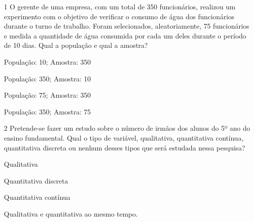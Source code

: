 \num{1} O gerente de uma empresa, com um total de 350 funcionários,
realizou um experimento com o objetivo de verificar o consumo de água
dos funcionários durante o turno de trabalho. Foram selecionados,
aleatoriamente, 75 funcionários e medida a quantidade de água consumida
por cada um deles durante o período de 10 dias. Qual a população e qual
a amostra?

\begin{minipage}{.5\textwidth}
\begin{escolha}
\item
  População: 10; Amostra: 350
\item
  População: 350; Amostra: 10
\item
  População: 75; Amostra: 350
\item
  População: 350; Amostra: 75
\end{escolha}
\end{minipage}

\num{2} Pretende-se fazer um estudo sobre o número de irmãos dos alunos do
5º ano do ensino fundamental. Qual o tipo de variável, qualitativa,
quantitativa contínua, quantitativa discreta ou nenhum desses tipos que
será estudada nessa pesquisa?

\begin{minipage}{.5\textwidth}
\begin{escolha}
\item
  Qualitativa
\item
  Quantitativa discreta
\item
  Quantitativa contínua
\item
  Qualitativa e quantitativa ao mesmo tempo.
\end{escolha}
\end{minipage}

